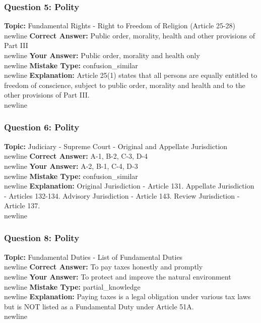 \documentclass[a4paper,12pt]{article}
\begin{document}
\subsubsection{Question 5: Polity}
\textbf{Topic:} Fundamental Rights - Right to Freedom of Religion (Article 25-28)\\newline
\textbf{Correct Answer:} Public order, morality, health and other provisions of Part III\\newline
\textbf{Your Answer:} \textcolor{wrongred}{Public order, morality and health only}\\newline
\textbf{Mistake Type:} confusion\_similar\\newline
\textbf{Explanation:} Article 25(1) states that all persons are equally entitled to freedom of conscience, subject to public order, morality and health and to the other provisions of Part III.\\newline
\vspace{0.5cm}
\subsubsection{Question 6: Polity}
\textbf{Topic:} Judiciary - Supreme Court - Original and Appellate Jurisdiction\\newline
\textbf{Correct Answer:} A-1, B-2, C-3, D-4\\newline
\textbf{Your Answer:} \textcolor{wrongred}{A-2, B-1, C-4, D-3}\\newline
\textbf{Mistake Type:} confusion\_similar\\newline
\textbf{Explanation:} Original Jurisdiction - Article 131. Appellate Jurisdiction - Articles 132-134. Advisory Jurisdiction - Article 143. Review Jurisdiction - Article 137.\\newline
\vspace{0.5cm}
\subsubsection{Question 8: Polity}
\textbf{Topic:} Fundamental Duties - List of Fundamental Duties\\newline
\textbf{Correct Answer:} To pay taxes honestly and promptly\\newline
\textbf{Your Answer:} \textcolor{wrongred}{To protect and improve the natural environment}\\newline
\textbf{Mistake Type:} partial\_knowledge\\newline
\textbf{Explanation:} Paying taxes is a legal obligation under various tax laws but is NOT listed as a Fundamental Duty under Article 51A.\\newline
\vspace{0.5cm}
\end{document}
